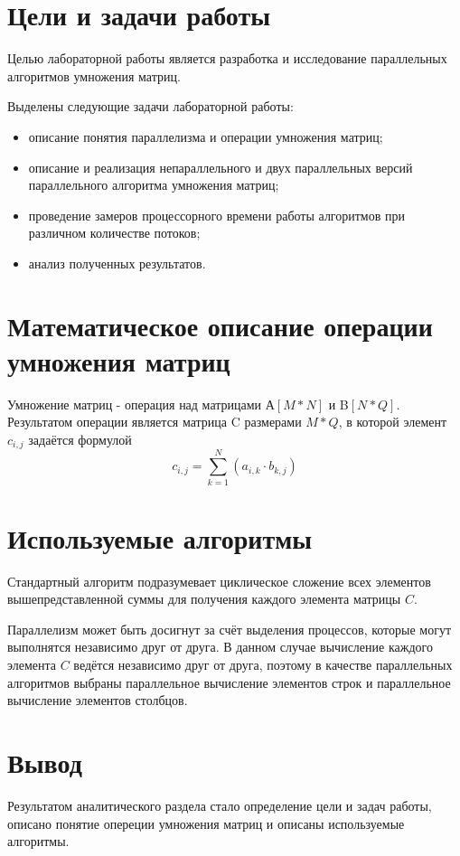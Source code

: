 \section{Цели и задачи работы}
Целью лабораторной работы является разработка и исследование параллельных алгоритмов умножения матриц.

Выделены следующие задачи лабораторной работы:

\begin{itemize}
\item описание понятия параллелизма и операции умножения матриц;
\item описание и реализация непараллельного и двух параллельных версий параллельного алгоритма умножения матриц;
\item проведение замеров процессорного времени работы алгоритмов при различном количестве потоков;
\item анализ полученных результатов.
\end{itemize}

\section{Математическое описание операции умножения матриц}
Умножение матриц - операция над матрицами А$[M*N] $ и B$[N*Q]$. Результатом операции является матрица C размерами $ M*Q $, в которой элемент $c_{i,j}$ задаётся формулой
\begin{equation} 
	c_{i,j} = \sum_{k=1}^{N}(a_{i,k} \cdot b_{k,j})
\end{equation}


\section{Используемые алгоритмы}
Стандартный алгоритм подразумевает циклическое сложение всех элементов вышепредставленной суммы для получения каждого элемента матрицы $C$.

Параллелизм может быть досигнут за счёт выделения процессов, которые могут выполнятся независимо друг от друга. В данном случае вычисление каждого элемента $C$ ведётся независимо друг от друга, поэтому в качестве параллельных алгоритмов выбраны параллельное вычисление элементов строк и параллельное вычисление элементов столбцов.

\section*{Вывод}
Результатом аналитического раздела стало определение цели и задач работы, описано понятие опереции умножения матриц и описаны используемые алгоритмы.
